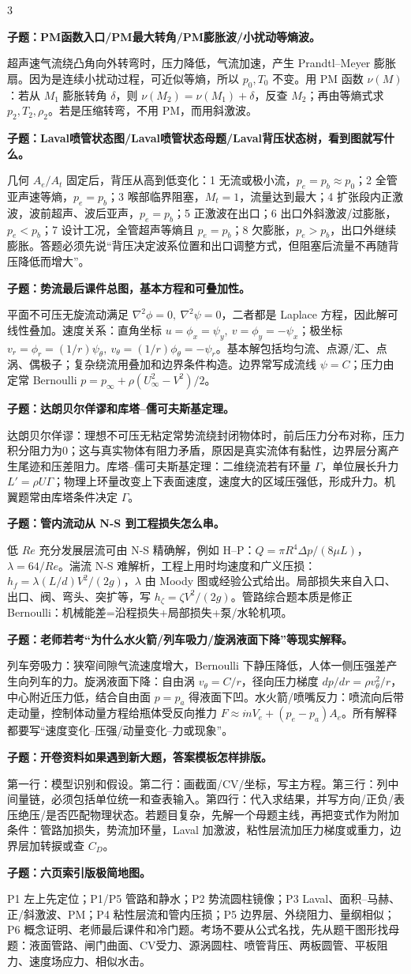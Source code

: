 \documentclass[a4paper]{article}
\newcommand{\qt}[1]{\vspace{0.10pt}\colorbox{Q}{\parbox{\dimexpr\linewidth-2\fboxsep}{\color{white}\bfseries #1}}\par}
\newcommand{\ans}[1]{\colorbox{G}{\parbox{\dimexpr\linewidth-2\fboxsep}{#1}}\par}
\begin{document}
\begin{multicols}{3}
\qt{子题：PM函数入口/PM最大转角/PM膨胀波/小扰动等熵波。}
\ans{超声速气流绕凸角向外转弯时，压力降低，气流加速，产生 Prandtl--Meyer 膨胀扇。因为是连续小扰动过程，可近似等熵，所以 $p_0,T_0$ 不变。用 PM 函数 $\nu(M)$：若从 $M_1$ 膨胀转角 $\delta$，则 $\nu(M_2)=\nu(M_1)+\delta$，反查 $M_2$；再由等熵式求 $p_2,T_2,\rho_2$。若是压缩转弯，不用 PM，而用斜激波。}
\qt{子题：Laval喷管状态图/Laval喷管状态母题/Laval背压状态树，看到图就写什么。}
\ans{几何 $A_e/A_t$ 固定后，背压从高到低变化：1 无流或极小流，$p_e=p_b\approx p_0$；2 全管亚声速等熵，$p_e=p_b$；3 喉部临界阻塞，$M_t=1$，流量达到最大；4 扩张段内正激波，波前超声、波后亚声，$p_e=p_b$；5 正激波在出口；6 出口外斜激波/过膨胀，$p_e<p_b$；7 设计工况，全管超声等熵且 $p_e=p_b$；8 欠膨胀，$p_e>p_b$，出口外继续膨胀。答题必须先说“背压决定波系位置和出口调整方式，但阻塞后流量不再随背压降低而增大”。}
\qt{子题：势流最后课件总图，基本方程和可叠加性。}
\ans{平面不可压无旋流动满足 $\nabla^2\phi=0,\ \nabla^2\psi=0$，二者都是 Laplace 方程，因此解可线性叠加。速度关系：直角坐标 $u=\phi_x=\psi_y,\ v=\phi_y=-\psi_x$；极坐标 $v_r=\phi_r=(1/r)\psi_\theta,\ v_\theta=(1/r)\phi_\theta=-\psi_r$。基本解包括均匀流、点源/汇、点涡、偶极子；复杂绕流用叠加和边界条件构造。边界常写成流线 $\psi=C$；压力由定常 Bernoulli $p=p_\infty+\rho(U_\infty^2-V^2)/2$。}
\qt{子题：达朗贝尔佯谬和库塔--儒可夫斯基定理。}
\ans{达朗贝尔佯谬：理想不可压无粘定常势流绕封闭物体时，前后压力分布对称，压力积分阻力为0；这与真实物体有阻力矛盾，原因是真实流体有黏性，边界层分离产生尾迹和压差阻力。库塔--儒可夫斯基定理：二维绕流若有环量 $\Gamma$，单位展长升力 $L'=\rho U\Gamma$；物理上环量改变上下表面速度，速度大的区域压强低，形成升力。机翼题常由库塔条件决定 $\Gamma$。}
\qt{子题：管内流动从 N-S 到工程损失怎么串。}
\ans{低 $Re$ 充分发展层流可由 N-S 精确解，例如 H--P：$Q=\pi R^4\Delta p/(8\mu L)$，$\lambda=64/Re$。湍流 N-S 难解析，工程上用时均速度和广义压损：$h_f=\lambda(L/d)V^2/(2g)$，$\lambda$ 由 Moody 图或经验公式给出。局部损失来自入口、出口、阀、弯头、突扩等，写 $h_\zeta=\zeta V^2/(2g)$。管路综合题本质是修正 Bernoulli：机械能差=沿程损失+局部损失+泵/水轮机项。}
\qt{子题：老师若考“为什么水火箭/列车吸力/旋涡液面下降”等现实解释。}
\ans{列车旁吸力：狭窄间隙气流速度增大，Bernoulli 下静压降低，人体一侧压强差产生向列车的力。旋涡液面下降：自由涡 $v_\theta=C/r$，径向压力梯度 $dp/dr=\rho v_\theta^2/r$，中心附近压力低，结合自由面 $p=p_a$ 得液面下凹。水火箭/喷嘴反力：喷流向后带走动量，控制体动量方程给瓶体受反向推力 $F\approx\dot m V_e+(p_e-p_a)A_e$。所有解释都要写“速度变化--压强/动量变化--力或现象”。}
\qt{子题：开卷资料如果遇到新大题，答案模板怎样排版。}
\ans{第一行：模型识别和假设。第二行：画截面/CV/坐标，写主方程。第三行：列中间量链，必须包括单位统一和查表输入。第四行：代入求结果，并写方向/正负/表压绝压/是否匹配物理状态。若题目复杂，先解一个母题主线，再把变式作为附加条件：管路加损失，势流加环量，Laval 加激波，粘性层流加压力梯度或重力，边界层加转捩或查 $C_D$。}
\qt{子题：六页索引版极简地图。}
\ans{P1 左上先定位；P1/P5 管路和静水；P2 势流圆柱镜像；P3 Laval、面积--马赫、正/斜激波、PM；P4 粘性层流和管内压损；P5 边界层、外绕阻力、量纲相似；P6 概念证明、老师最后课件和冷门题。考场不要从公式名找，先从题干图形找母题：液面管路、闸门曲面、CV受力、源涡圆柱、喷管背压、两板圆管、平板阻力、速度场应力、相似水击。}


\end{multicols}
\end{document}
